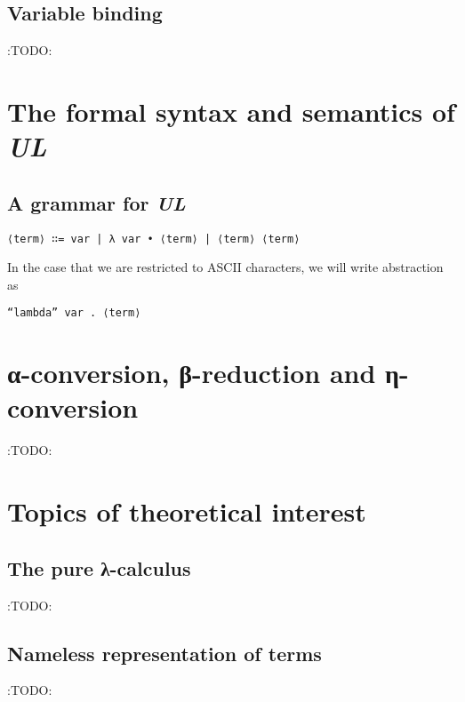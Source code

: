 \documentclass[11pt]{article}
\theoremstyle{definition}
\begin{document}
\subsection{Variable binding}
\label{sec:org6552258}

:TODO:

\section{The formal syntax and semantics of \emph{UL}}
\label{sec:orgbc3c36b}

\subsection{A grammar for \emph{UL}}
\label{sec:org8f56a83}

\begin{verbatim}
⟨term⟩ ∷= var | λ var • ⟨term⟩ | ⟨term⟩ ⟨term⟩
\end{verbatim}

In the case that we are restricted to ASCII characters,
we will write abstraction as
\begin{verbatim}
“lambda” var . ⟨term⟩
\end{verbatim}

\section{α-conversion, β-reduction and η-conversion}
\label{sec:org62c600a}

:TODO:

\section{Topics of theoretical interest}
\label{sec:org5722189}

\subsection{The pure λ-calculus}
\label{sec:org869f696}

:TODO:

\subsection{Nameless representation of terms}
\label{sec:orgd8d36a8}

:TODO:
\end{document}
